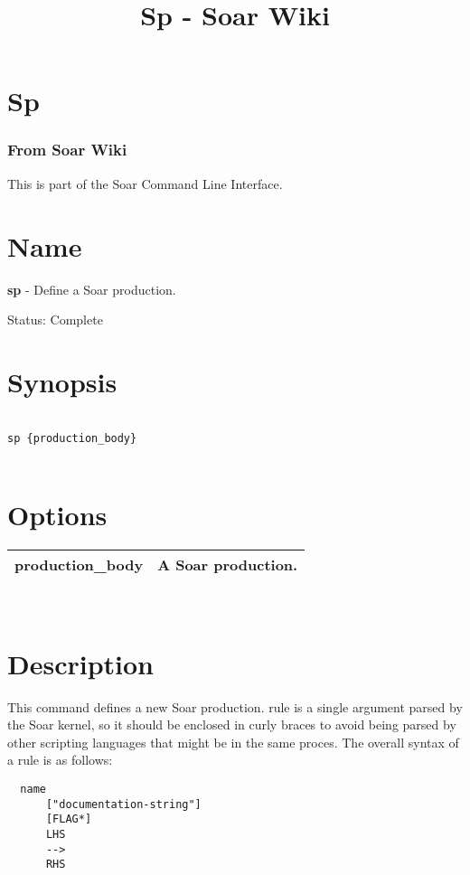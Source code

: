 \documentclass[10pt]{article}
\title{Sp - Soar Wiki}
\begin{document}
\section*{Sp}
\subsubsection*{From Soar Wiki}


 This is part of the Soar Command Line Interface. 
\section*{ Name }


 \textbf{sp}
 - Define a Soar production. 


 Status: Complete
\section*{ Synopsis }
\begin{verbatim}

sp {production_body}


\end{verbatim}
\section*{ Options }


\begin{tabular}{|c|c|}
\hline 
 production\_body  & A Soar production.  \\
 \hline 

\end{tabular}



 \\ 

\section*{ Description }


 This command defines a new Soar production. rule is a single argument parsed by the Soar kernel, so it should be enclosed in curly braces to avoid being parsed by other scripting languages that might be in the same proces. The overall syntax of a rule is as follows: \begin{verbatim}
  name 
      ["documentation-string"] 
      [FLAG*]
      LHS
      -->
      RHS

\end{verbatim}
\end{document}
